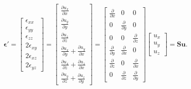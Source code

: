 \documentclass[acmtog]{acmart}
\begin{document}
%
\begin{equation}
  \boldsymbol \epsilon' = \begin{bmatrix}
    \epsilon_{xx}   \\
    \epsilon_{yy}   \\
    \epsilon_{zz}   \\
    2 \epsilon_{xy} \\
    2 \epsilon_{xz} \\
    2 \epsilon_{yz}
  \end{bmatrix} = \begin{bmatrix}
    \displaystyle \frac{ \partial u_x }{ \partial x }                                       \\
    \displaystyle \frac{ \partial u_y }{ \partial y }                                       \\
    \displaystyle \frac{ \partial u_z }{ \partial z }                                       \\
    \displaystyle \frac{ \partial u_x }{ \partial y } + \frac{ \partial u_y }{ \partial x } \\
    \displaystyle \frac{ \partial u_x }{ \partial z } + \frac{ \partial u_z }{ \partial x } \\
    \displaystyle \frac{ \partial u_y }{ \partial z } + \frac{ \partial u_z }{ \partial y }
  \end{bmatrix} = \begin{bmatrix}
    \displaystyle \frac{ \partial  }{ \partial x } & \displaystyle 0                                & \displaystyle 0                                \\
    \displaystyle 0                                & \displaystyle \frac{ \partial  }{ \partial y } & \displaystyle 0                                \\
    \displaystyle 0                                & \displaystyle 0                                & \displaystyle \frac{ \partial  }{ \partial z } \\
    \displaystyle \frac{ \partial  }{ \partial y } & \displaystyle \frac{ \partial  }{ \partial x } & \displaystyle 0                                \\
    \displaystyle \frac{ \partial  }{ \partial z } & \displaystyle 0                                & \displaystyle \frac{ \partial  }{ \partial x } \\
    \displaystyle 0                                & \displaystyle \frac{ \partial  }{ \partial z } & \displaystyle \frac{ \partial  }{ \partial y }
  \end{bmatrix} \begin{bmatrix}
    u_x \\
    u_y \\
    u_z
  \end{bmatrix} = \boldsymbol S \boldsymbol u.
\end{equation}
%
\end{document}
